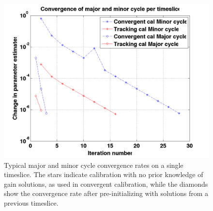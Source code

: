 \documentclass{aa}
\begin{document}




\begin{figure}[tbh]
\centering
\includegraphics[width=1\textwidth]{Figs/major_minor_cycle_conv.png}

\caption{\label{fig:Convergence-behaviour-of}Typical   major  and   minor  cycle
  convergence rates on  a single timeslice. The stars  indicate calibration with
  no prior knowledge of gain solutions, as used in convergent calibration, while
  the diamonds  show the convergence rate after  pre-initializing with solutions
  from a previous timeslice.}
\end{figure}
\end{document}
